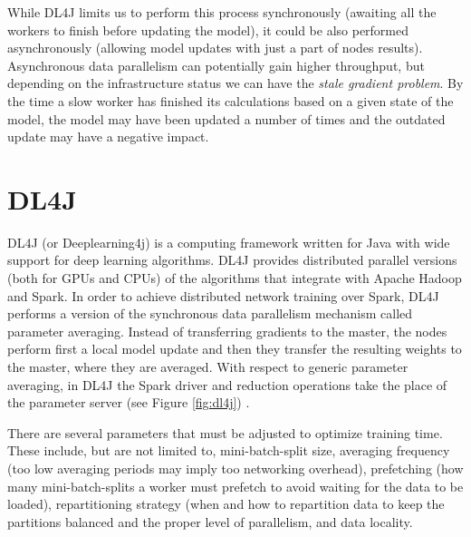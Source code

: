 \documentclass[journal]{IEEEtran}
\begin{document}
While DL4J limits us to perform this process synchronously (awaiting all the workers to finish before updating the model), it could be also performed asynchronously (allowing model updates with just a part of nodes results). Asynchronous data parallelism can potentially gain higher throughput, but depending on the infrastructure status we can have the {\it stale gradient problem}. By the time a slow worker has finished its calculations based on a given state of the model, the model may have been updated a number of times and the outdated update may have a negative impact.


\section{DL4J}
\label{sec:spark}
DL4J (or Deeplearning4j) is a computing framework written for Java with wide support for deep learning algorithms. DL4J provides distributed parallel versions (both for GPUs and CPUs) of the algorithms that integrate with Apache Hadoop and Spark. In order to achieve distributed network training over Spark, DL4J performs a version of the synchronous data parallelism mechanism called parameter averaging. Instead of transferring gradients to the master, the nodes perform first a local model update and then they transfer the resulting weights to the master, where they are averaged. With respect to generic parameter averaging, in DL4J the Spark driver and reduction operations take the place of the parameter server (see Figure \ref{fig:dl4j}) . 

There are several parameters that must be adjusted to optimize training time. These include, but are not limited to, mini-batch-split size, averaging frequency (too low averaging periods may imply too networking overhead), prefetching (how many mini-batch-splits a worker must prefetch to avoid waiting for the data to be loaded), repartitioning strategy (when and how to repartition data to keep the partitions balanced and the proper level of parallelism, and data locality. 
\end{document}
